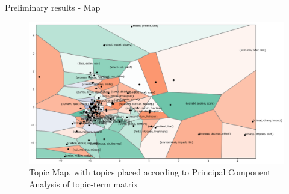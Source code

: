 \documentclass[9pt]{beamer}
\begin{document}
\begin{frame}{Preliminary results - Map}

\begin{figure}
			\includegraphics[width=\linewidth]{../plots/pca_map.png}
			\caption{Topic Map, with topics placed according to Principal Component Analysis of topic-term matrix}
\end{figure}

\end{frame}
\end{document}
